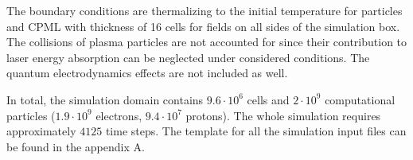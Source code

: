 The boundary conditions are thermalizing to the initial temperature for particles and CPML \cite{Roden2000} with thickness of 16 cells for fields on all sides of the simulation box. The collisions of plasma particles are not accounted for since their contribution to laser energy absorption can be neglected under considered conditions. The quantum electrodynamics effects are not included as well.

In total, the simulation domain contains $ 9.6 \cdot 10^{6} $ cells and $ 2 \cdot 10^{9} $ computational particles ($ 1.9 \cdot 10^{9} $ electrons, $ 9.4 \cdot 10^{7} $ protons). The whole simulation requires approximately $ 4125 $ time steps. The template for all the simulation input files can be found in the appendix A.